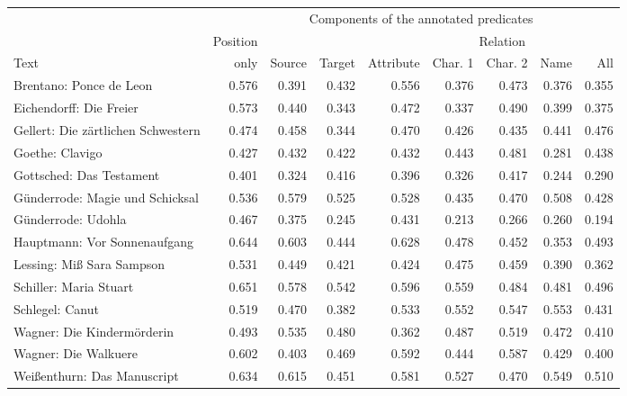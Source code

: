 \documentclass[border=0.2cm]{standalone}
\begin{document}
\begin{tabular}{lrrrrrrrr}
\toprule
 & & \multicolumn{6}{c}{Components of the annotated predicates} &  \\
\cmidrule{3-8}
& {Position} & & & & \multicolumn{3}{c}{Relation} & \\
\cmidrule{6-8}
Text & {only} & {Source} & {Target} & {Attribute} & {Char. 1} & {Char. 2} & {Name} & {All} \\
\midrule
Brentano: Ponce de Leon  & 0.576 & 0.391 & 0.432 & 0.556 & 0.376 & 0.473 & 0.376 & 0.355 \\
Eichendorff: Die Freier & 0.573 & 0.440 & 0.343 & 0.472 & 0.337 & 0.490 & 0.399 & 0.375 \\
Gellert: Die zärtlichen Schwestern & 0.474 & 0.458 & 0.344 & 0.470 & 0.426 & 0.435 & 0.441 & 0.476 \\
Goethe: Clavigo & 0.427 & 0.432 & 0.422 & 0.432 & 0.443 & 0.481 & 0.281 & 0.438 \\
Gottsched: Das Testament & 0.401 & 0.324 & 0.416 & 0.396 & 0.326 & 0.417 & 0.244 & 0.290 \\
Günderrode: Magie und Schicksal & 0.536 & 0.579 & 0.525 & 0.528 & 0.435 & 0.470 & 0.508 & 0.428 \\
Günderrode: Udohla & 0.467 & 0.375 & 0.245 & 0.431 & 0.213 & 0.266 & 0.260 & 0.194 \\
Hauptmann: Vor Sonnenaufgang & 0.644 & 0.603 & 0.444 & 0.628 & 0.478 & 0.452 & 0.353 & 0.493 \\
Lessing: Miß Sara Sampson & 0.531 & 0.449 & 0.421 & 0.424 & 0.475 & 0.459 & 0.390 & 0.362 \\
Schiller: Maria Stuart & 0.651 & 0.578 & 0.542 & 0.596 & 0.559 & 0.484 & 0.481 & 0.496 \\
Schlegel: Canut & 0.519 & 0.470 & 0.382 & 0.533 & 0.552 & 0.547 & 0.553 & 0.431 \\
Wagner: Die Kindermörderin & 0.493 & 0.535 & 0.480 & 0.362 & 0.487 & 0.519 & 0.472 & 0.410 \\
Wagner: Die Walkuere & 0.602 & 0.403 & 0.469 & 0.592 & 0.444 & 0.587 & 0.429 & 0.400 \\
Weißenthurn: Das Manuscript & 0.634 & 0.615 & 0.451 & 0.581 & 0.527 & 0.470 & 0.549 & 0.510 \\
\bottomrule
\end{tabular}
\end{document}

